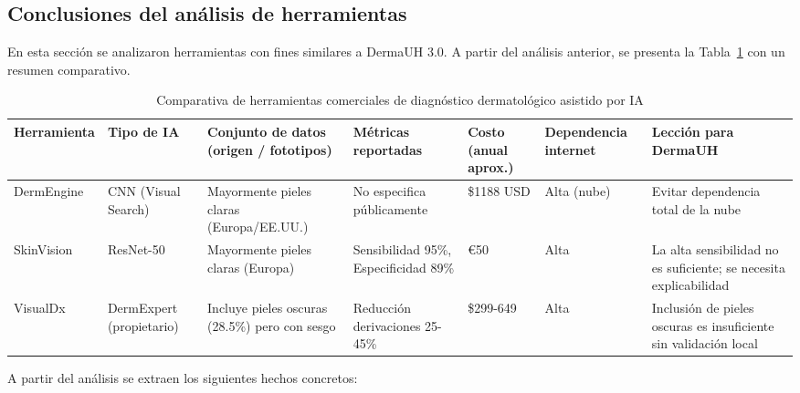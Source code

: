 \subsection{Conclusiones del análisis de herramientas}

En esta sección se analizaron herramientas con fines similares a DermaUH 3.0. A partir del análisis anterior, se presenta la Tabla~\ref{tab:comparativa_herramientas} con un resumen comparativo.

\begin{table}[ht]
    \centering
    \footnotesize
    \caption{Comparativa de herramientas comerciales de diagnóstico dermatológico asistido por IA}
    \label{tab:comparativa_herramientas}
    \begin{tabularx}{\textwidth}{|>{\raggedright\arraybackslash}X|>{\raggedright\arraybackslash}X|>{\raggedright\arraybackslash}X|>{\raggedright\arraybackslash}X|>{\raggedright\arraybackslash}X|>{\raggedright\arraybackslash}X|>{\raggedright\arraybackslash}X|}
        \hline
        \textbf{Herramienta} & \textbf{Tipo de IA} & \textbf{Conjunto de datos (origen / fototipos)} & \textbf{Métricas reportadas} & \textbf{Costo (anual aprox.)} & \textbf{Dependencia internet} & \textbf{Lección para DermaUH} \\
        \hline
        DermEngine & CNN (Visual Search) & Mayormente pieles claras (Europa/EE.UU.) & No especifica públicamente & \$1188 USD & Alta (nube) & Evitar dependencia total de la nube \\
        \hline
        SkinVision & ResNet-50 & Mayormente pieles claras (Europa) & Sensibilidad 95\%, Especificidad 89\% & €50 & Alta & La alta sensibilidad no es suficiente; se necesita explicabilidad \\
        \hline
        VisualDx & DermExpert (propietario) & Incluye pieles oscuras (28.5\%) pero con sesgo & Reducción derivaciones 25-45\% & \$299-649 & Alta & Inclusión de pieles oscuras es insuficiente sin validación local \\
        \hline
    \end{tabularx}
\end{table}

A partir del análisis se extraen los siguientes hechos concretos:

